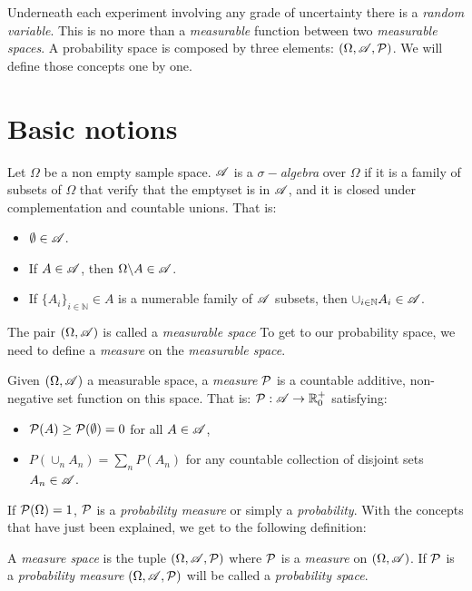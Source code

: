 

Underneath each experiment involving any grade of uncertainty there is a \emph{random variable}. This is no more than a \emph{measurable} function between two \emph{measurable spaces}.
A probability space is composed by three elements: $(\Omega, \mathscr{A}, \mathcal{P})$. We will define those concepts one by one.

\section{Basic notions}

\begin{ndef}Let $\Omega$ be a non empty sample space. $\mathscr{A}$ is a \emph{$\sigma-$algebra} over $\Omega$ if it is a family of subsets of $\Omega$ that verify that the emptyset is in $\mathscr{A}$, and it is closed under complementation and countable unions. That is:
\begin{itemize}
  \item $\emptyset \in \mathscr{A}$.
  \item If $A \in \mathscr{A}$, then $\Omega \backslash A \in \mathscr{A}$.
  \item If $\{A_i\}_{i \in \mathbb N} \in A$ is a numerable family of $\mathscr{A}$ subsets, then $\cup_{i \in \mathbb N} A_i \in \mathscr{A}$.
\end{itemize}
\end{ndef}


The pair $(\Omega,\mathscr{A})$ is called a \emph{measurable space} To get to our probability space, we need to define a \emph{measure} on the \emph{measurable space}.

\begin{ndef}
Given $(\Omega,\mathscr{A})$ a measurable space, a \emph{measure} $\mathcal{P}$ is a countable additive, non-negative set function on this space. That is: $\mathcal{P}: \mathscr{A} \to \mathbb R_0^+$ satisfying:
\begin{itemize}
  \item $\mathcal{P}(A) \geq \mathcal{P}(\emptyset) = 0$ for all $A \in \mathscr{A}$,
  \item $P(\cup_n A_n) = \sum_n P(A_n)$ for any countable collection of disjoint sets $A_n \in \mathscr{A}$.
\end{itemize}
\end{ndef}

If $\mathcal{P}(\Omega) = 1$, $\mathcal{P}$ is a \emph{probability measure} or simply a \emph{probability}. With the concepts that have just been explained, we get to the following definition:

\begin{ndef}
A \emph{measure space} is the tuple $(\Omega, \mathscr{A},\mathcal{P})$ where $\mathcal{P}$ is a \emph{measure} on $(\Omega, \mathscr{A})$. If $\mathcal{P}$ is a \emph{probability measure} $(\Omega,\mathscr{A},\mathcal{P})$ will be called a \emph{probability space}.
\end{ndef}

